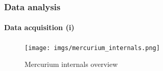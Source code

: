 \documentclass{beamer}
\begin{document}
\begin{frame}
\frametitle{Data analysis}
\framesubtitle{Data acquisition (i)}
\begin{figure}
\texttt{[image: imgs/mercurium\_internals.png]}
\caption{Mercurium internals overview}
\end{figure}
\end{frame}


\end{document}
